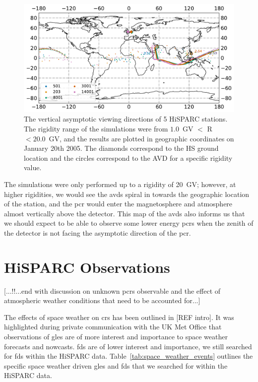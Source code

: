 \begin{figure}[ht!]
	\centering
	\includegraphics[scale=0.6]{HS_AVDs.pdf}
	\caption{The vertical asymptotic viewing directions of 5 HiSPARC stations. The rigidity range of the simulations were from $1.0$~GV $<$ R $<20.0$~GV, and the results are plotted in geographic coordinates on January 20th 2005. The diamonds correspond to the HS ground location and the circles correspond to the AVD for a specific rigidity value.}
	\label{fig:HS_AVD}
\end{figure}

The simulations were only performed up to a rigidity of 20~GV; however, at higher rigidities, we would see the \glspl{avd} spiral in towards the geographic location of the station, and the \gls{pcr} would enter the magnetosphere and atmosphere almost vertically above the detector. This map of the \glspl{avd} also informs us that we should expect to be able to observe some lower energy \glspl{pcr} when the zenith of the detector is not facing the asymptotic direction of the \gls{pcr}.

\section{HiSPARC Observations}\label{sec:HS_obs}


[...!!...end with discussion on unknown \glspl{pcr} observable and the effect of atmospheric weather conditions that need to be accounted for...]

The effects of space weather on \glspl{cr} has been outlined in [REF intro]. It was highlighted during private communication with the UK Met Office that observations of \glspl{gle} are of more interest and importance to space weather forecasts and nowcasts. \glspl{fd} are of lower interest and importance, we still searched for \glspl{fd} within the HiSPARC data. Table~\ref{tab:space_weather_events} outlines the specific space weather driven \glspl{gle} and \glspl{fd} that we searched for within the HiSPARC data.

